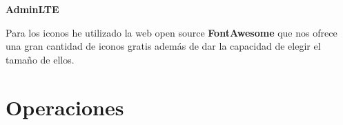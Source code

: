 \textbf{AdminLTE} \cite{adminlte}

Para los iconos he utilizado la web open source \textbf{FontAwesome} \cite{iconos} que nos 
ofrece una gran cantidad de iconos gratis además de dar la capacidad de elegir el tamaño de ellos.

\section{Operaciones}


\begin{figure}[H]
  \centering
  \noindent{}
  \caption{}
\end{figure}

\begin{figure}[H]
  \centering
  \noindent{}
  \caption{}
\end{figure}

\begin{figure}[H]
  \centering
  \noindent{}
  \caption{}
\end{figure}

\begin{figure}[H]
  \centering
  \noindent{}
  \caption{}
\end{figure}

\begin{figure}[H]
  \centering
  \noindent{}
  \caption{}
\end{figure}

\begin{figure}[H]
  \centering
  \noindent{}
  \caption{}
\end{figure}

\begin{figure}[H]
  \centering
  \noindent{}
  \caption{}
\end{figure}

\begin{figure}[H]
  \centering
  \noindent{}
  \caption{}
\end{figure}

